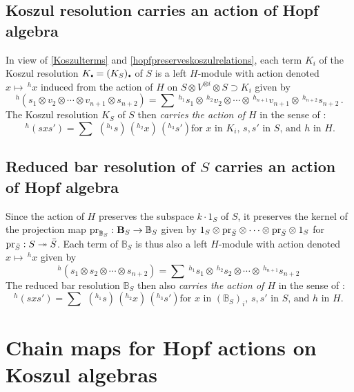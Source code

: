 \documentclass[11pt]{amsart}
\numberwithin{equation}{section}
\newcommand{\pr}{ {\rm{pr}} }%
\newcommand{\sd}{_{\DOT}}%
\newcommand{\B}{{\bf B}} %
\newcommand{\BB}{\mathbb{B}} %
\newcommand{\DOT}{\setlength{\unitlength}{1.2pt}\begin{picture}(2.5,2)
               (1,1)\put(2.5,2.5){\circle*{2}}\end{picture}}
\renewcommand{\_}[1]{\mbox{$_{\left( #1 \right)}$}}
\newcommand{\ot}{\otimes}
\begin{document}
{%
\subsection*{Koszul resolution carries an action of Hopf algebra}
In view of \cref{Koszulterms} and
\cref{hopfpreserveskoszulrelations}, 
each term $K_i$ of the Koszul resolution 
$K\sd=(K_S)\sd$ of $S$ is a left $H$-module 
with action denoted $x\mapsto \, ^hx$
induced from the action of $H$ on $S\ot V^{\ot i}\ot S\supset K_i$
given by 
\begin{equation}\label{HopfActionKoszulResolution}
  ^h(s_1\ot v_2\ot \cdots \ot v_{n+1}\ot s_{n+2})=
\sum \  ^{h_1}s_1\ot\, ^{h_2}v_2\ot\cdots \ot \, ^{h_{n+1}}v_{n+1}\ot 
\, ^{h_{n+2}}s_{n+2}
\, . 
\end{equation}
The Koszul resolution 
$K_S$ of $S$ then 
{\em carries the action of $H$} in the sense of 
\cite{TTP-AWEZ}: 
$$
\, ^{h} (sxs')=\sum\ \,(  ^{h_1}s)\, ( ^{h_2}x)\, ( ^{h_3} s') 
\text{
  for $x$ in $K_i$, $s, s'$ in $S$, and $h$ in $H$.}
$$

\subsection*{Reduced bar resolution of $S$ carries an action of Hopf algebra}
Since the action of $H$ preserves the subspace $k\cdot 1_S$ of $S$, it preserves
the kernel of the projection map $\pr_{\BB_S}: \B_S \rightarrow \BB_S$
given by
$1_S\ot \pr_{\bar S}\ot\cdots\ot  
\pr_{\bar S}\ot 1_S$ 
for 
$\pr_{\bar S}: S\twoheadrightarrow \bar S$. 
Each term of $\BB_S$ is thus also a left $H$-module 
with action denoted $x\mapsto \, ^hx$
given by 
\begin{equation}\label{HopfActionReducedBar}
  ^h(s_1\ot s_2\ot \cdots \ot s_{n+2})=
 \sum \  ^{h_1}s_1\ot \, ^{h_2}s_2\ot\cdots \ot 
\, ^{h_{n+1}}s_{n+2}
\, 
\end{equation}
The reduced bar resolution
$\BB_S$ then also
{\em carries the action of $H$} in the sense of 
\cite{TTP-AWEZ}: 
$$
\, ^{h} (sxs')=\sum\ \, ( ^{h_1}s)\, ( ^{h_2}x)\, ( ^{h_3} s') 
\text{
  for $x$ in $(\BB_S)_i$, $s, s'$ in $S$, and $h$ in $H$. }
$$

\section{Chain maps for Hopf actions on Koszul algebras}\label{sec:spr}

}
\end{document}
